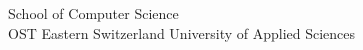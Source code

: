 \begin{titlepage}
\begin{center}
        \vfill


        \vspace{1cm}
        School of Computer Science\\
        OST Eastern Switzerland University of Applied Sciences

    \end{center}

\end{titlepage}